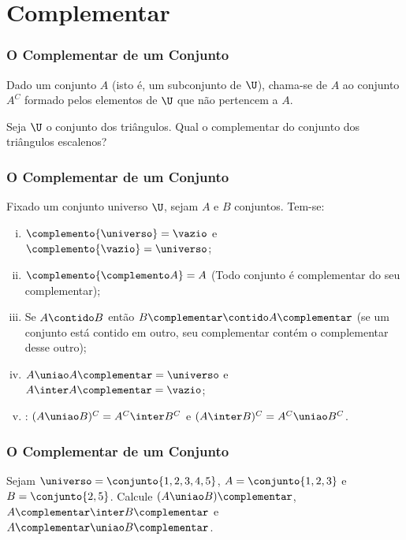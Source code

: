 \section{Complementar}


\begin{frame}
	\frametitle{O Complementar de um Conjunto}


	\begin{definicao}[Complementar]
		Dado um conjunto $A$ (isto é, um subconjunto de $\U$), chama-se  de $A$ ao conjunto $A^C$ formado pelos elementos de $\U$ que não pertencem a $A$.
	\end{definicao}\pause

	\begin{exemplo}
		Seja $\U$ o conjunto dos triângulos. Qual o complementar do conjunto dos triângulos escalenos?
	\end{exemplo}
\end{frame}


\begin{frame}
	\frametitle{O Complementar de um Conjunto}

	\begin{proposicao}
		\label{prop-comp}
		Fixado um conjunto universo $\U$, sejam $A$ e $B$ conjuntos. Tem-se:
		\begin{enumerate}[i.]
			\item $\complemento{\universo} = \vazio$ e $\complemento{\vazio} = \universo$;
			\item $\complemento{\complemento A} = A$ (Todo conjunto é complementar do seu complementar);
			\item Se $A \contido B$ então $B\complementar \contido A\complementar$ (se um conjunto está contido em outro, seu complementar contém o complementar desse outro);
			\item $A \uniao A\complementar = \universo$ e $A \inter A\complementar = \vazio$;
			\item {}: $(A \uniao B)^C = A^C \inter B^C$ e $(A \inter B)^C = A^C \uniao B^C$.
		\end{enumerate}
	\end{proposicao}

\end{frame}


\begin{frame}
	\frametitle{O Complementar de um Conjunto}

	\begin{exemplo}
		Sejam $\universo = \conjunto{1,2,3,4,5}$, $A = \conjunto{1, 2, 3}$ e $B = \conjunto{2, 5}$. Calcule $(A \uniao B)\complementar$, $A\complementar \inter B\complementar$ e $A\complementar \uniao B\complementar$.
	\end{exemplo}

\end{frame}



